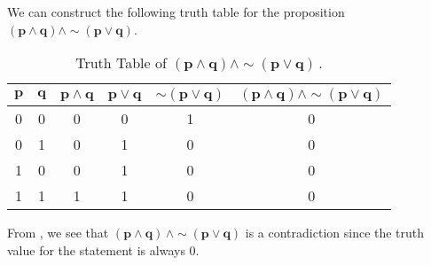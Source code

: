 %
%

\begin{subquestions}


\subquestion

We can construct the following truth table for the proposition $\boldsymbol{(p \land q) \land \sim (p \lor q)}$.
\begin{table}[ht]
	\centering
	\begin{tabular}{|c|c|c|c|c|c|}
		\hline
		$\boldsymbol{p}$ & $\boldsymbol{q}$ & $\boldsymbol{p \land q}$ & $\boldsymbol{p \lor q}$ & $\boldsymbol{\sim (p \lor q)}$ & $\boldsymbol{(p \land q) \land \sim (p \lor q)}$\\
		\hline
		0 & 0 & 0 & 0 & 1 & 0 \\
		0 & 1 & 0 & 1 & 0 & 0 \\
		1 & 0 & 0 & 1 & 0 & 0 \\
		1 & 1 & 1 & 1 & 0 & 0 \\
		\hline
	\end{tabular}
	\caption{\label{2013:q1:tab:TruthTab1} Truth Table of $\boldsymbol{(p \land q) \land \sim (p \lor q)}$\,.}
\end{table}


\subquestion

From , we see that $\boldsymbol{(p \land q)\, \land \sim (p \lor q)}$ is a contradiction since the truth value for the statement is always 0.



\end{subquestions}

